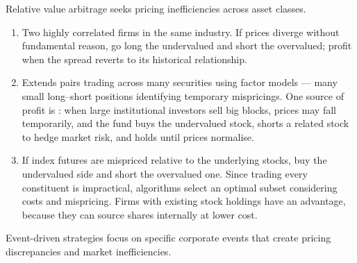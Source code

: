 Relative value arbitrage seeks pricing inefficiencies across asset classes.

\begin{enumerate}
\item {} Two highly correlated firms in the same industry. If
prices diverge without fundamental reason, go long the undervalued and short the
overvalued; profit when the spread reverts to its historical relationship.
\item {} Extends pairs trading across many securities
using factor models --- many small long--short positions identifying temporary
mispricings. One source of profit is : when large
institutional investors sell big blocks, prices may fall temporarily, and the fund
buys the undervalued stock, shorts a related stock to hedge market risk, and holds
until prices normalise.
\item {} If index futures are mispriced relative to the
underlying stocks, buy the undervalued side and short the overvalued one. Since
trading every constituent is impractical, algorithms select an optimal subset
considering costs and mispricing. Firms with existing stock holdings have an
advantage, because they can source shares internally at lower cost.
\end{enumerate}


Event-driven strategies focus on specific corporate events that create pricing
discrepancies and market inefficiencies.

